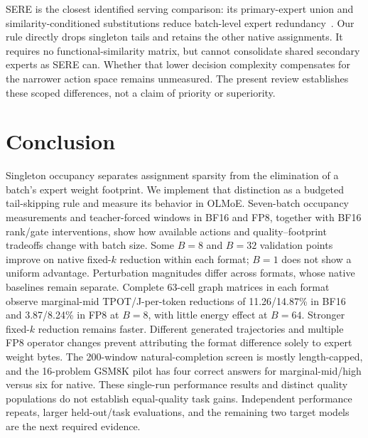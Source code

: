 \documentclass[10pt,twocolumn]{article}
\begin{document}
SERE is the closest identified serving comparison: its primary-expert union and similarity-conditioned substitutions reduce batch-level expert redundancy~\cite{sere}. Our rule directly drops singleton tails and retains the other native assignments. It requires no functional-similarity matrix, but cannot consolidate shared secondary experts as SERE can. Whether that lower decision complexity compensates for the narrower action space remains unmeasured. The present review establishes these scoped differences, not a claim of priority or superiority.



\section{Conclusion}
Singleton occupancy separates assignment sparsity from the elimination of a batch's expert weight footprint. We implement that distinction as a budgeted tail-skipping rule and measure its behavior in OLMoE. Seven-batch occupancy measurements and teacher-forced windows in BF16 and FP8, together with BF16 rank/gate interventions, show how available actions and quality--footprint tradeoffs change with batch size. Some $B=8$ and $B=32$ validation points improve on native fixed-$k$ reduction within each format; $B=1$ does not show a uniform advantage. Perturbation magnitudes differ across formats, whose native baselines remain separate. Complete 63-cell graph matrices in each format observe marginal-mid TPOT/J-per-token reductions of 11.26/14.87\% in BF16 and 3.87/8.24\% in FP8 at $B=8$, with little energy effect at $B=64$. Stronger fixed-$k$ reduction remains faster. Different generated trajectories and multiple FP8 operator changes prevent attributing the format difference solely to expert weight bytes. The 200-window natural-completion screen is mostly length-capped, and the 16-problem GSM8K pilot has four correct answers for marginal-mid/high versus six for native. These single-run performance results and distinct quality populations do not establish equal-quality task gains. Independent performance repeats, larger held-out/task evaluations, and the remaining two target models are the next required evidence.

{

}
\end{document}
